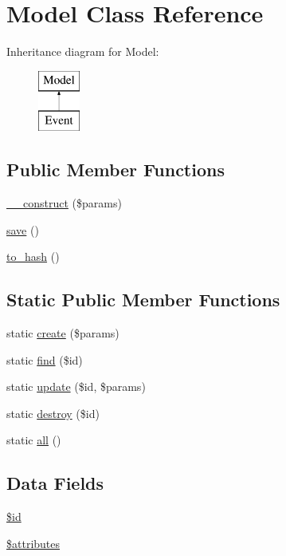 \hypertarget{class_model}{\section{\-Model \-Class \-Reference}
\label{class_model}
}
\-Inheritance diagram for \-Model\-:\begin{figure}[H]
\begin{center}
\leavevmode
\includegraphics[height=2.000000cm]{class_model}
\end{center}
\end{figure}
\subsection*{\-Public \-Member \-Functions}
\begin{DoxyCompactItemize}
\item 
\hyperlink{class_model_a9162320adff1a1a4afd7f2372f753a3e}{\-\_\-\-\_\-construct} (\$params)
\item 
\hyperlink{class_model_afc8a3c62679cf00ade9f15fb2a6d6132}{save} ()
\item 
\hyperlink{class_model_a8dd313b1ab84d81f9a0274bdbc163eaa}{to\-\_\-hash} ()
\end{DoxyCompactItemize}
\subsection*{\-Static \-Public \-Member \-Functions}
\begin{DoxyCompactItemize}
\item 
static \hyperlink{class_model_a1a8f87969a9f1cd9dd1a5f31ba7050f5}{create} (\$params)
\item 
static \hyperlink{class_model_a81c10d82a8d5a0c5839b34d81b7dff39}{find} (\$id)
\item 
static \hyperlink{class_model_ae858a97f76a3de2c8e68d42e17f7325c}{update} (\$id, \$params)
\item 
static \hyperlink{class_model_a0b9700ce5559edb7d28faba608569649}{destroy} (\$id)
\item 
static \hyperlink{class_model_a211470a063d4e3972d3c2e4541c38707}{all} ()
\end{DoxyCompactItemize}
\subsection*{\-Data \-Fields}
\begin{DoxyCompactItemize}
\item 
\hyperlink{class_model_ae97941710d863131c700f069b109991e}{\$id}
\item 
\hyperlink{class_model_adc851f7a62250e75df0490c0280aef4c}{\$attributes}
\end{DoxyCompactItemize}


